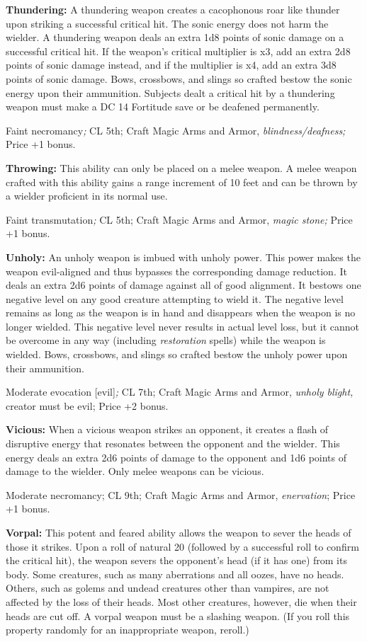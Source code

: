 \textbf{Thundering:} A thundering weapon creates a cacophonous roar like thunder 
upon striking a successful critical hit. The sonic energy does not harm the wielder. 
A thundering weapon deals an extra 1d8 points of sonic damage on a successful critical 
hit. If the weapon's critical multiplier is x3, add an extra 2d8 points of sonic 
damage instead, and if the multiplier is x4, add an extra 3d8 points of sonic damage. 
Bows, crossbows, and slings so crafted bestow the sonic energy upon their ammunition. 
Subjects dealt a critical hit by a thundering weapon must make a DC 14 Fortitude 
save or be deafened permanently.

Faint necromancy\textit{; }CL 5th; Craft Magic Arms and Armor, \textit{blindness/deafness; 
}Price +1 bonus.

\textbf{Throwing: }This ability can only be placed on a melee weapon. A melee weapon 
crafted with this ability gains a range increment of 10 feet and can be thrown 
by a wielder proficient in its normal use.

Faint transmutation\textit{; }CL 5th; Craft Magic Arms and Armor, \textit{magic 
stone; }Price +1 bonus.

\textbf{Unholy:} An unholy weapon is imbued with unholy power. This power makes 
the weapon evil-aligned and thus bypasses the corresponding damage reduction. It 
deals an extra 2d6 points of damage against all of good alignment. It bestows one 
negative level on any good creature attempting to wield it. The negative level 
remains as long as the weapon is in hand and disappears when the weapon is no longer 
wielded. This negative level never results in actual level loss, but it cannot 
be overcome in any way (including \textit{restoration }spells) while the weapon 
is wielded. Bows, crossbows, and slings so crafted bestow the unholy power upon 
their ammunition.

Moderate evocation [evil]\textit{; }CL 7th; Craft Magic Arms and Armor, \textit{unholy 
blight, }creator must be evil; Price +2 bonus.

\textbf{Vicious:} When a vicious weapon strikes an opponent, it creates a flash 
of disruptive energy that resonates between the opponent and the wielder. This 
energy deals an extra 2d6 points of damage to the opponent and 1d6 points of damage 
to the wielder. Only melee weapons can be vicious.

Moderate necromancy; CL 9th; Craft Magic Arms and Armor, \textit{enervation}; Price 
+1 bonus.

\textbf{Vorpal:} This potent and feared ability allows the weapon to sever the 
heads of those it strikes. Upon a roll of natural 20 (followed by a successful 
roll to confirm the critical hit), the weapon severs the opponent's head (if it 
has one) from its body. Some creatures, such as many aberrations and all oozes, 
have no heads. Others, such as golems and undead creatures other than vampires, 
are not affected by the loss of their heads. Most other creatures, however, die 
when their heads are cut off. A vorpal weapon must be a slashing weapon. (If you 
roll this property randomly for an inappropriate weapon, reroll.)

